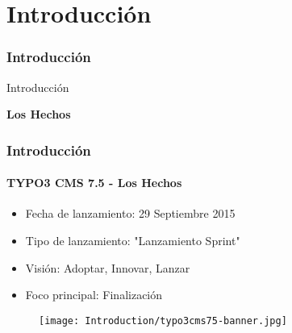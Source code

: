 %

\section{Introducción}
\begin{frame}[fragile]
	\frametitle{Introducción}

	\begin{center}\huge{Introducción}\end{center}
	\begin{center}\huge{\color{typo3darkgrey}\textbf{Los Hechos}}\end{center}

\end{frame}

\begin{frame}[fragile]
	\frametitle{Introducción}
	\framesubtitle{TYPO3 CMS 7.5 - Los Hechos}

	\begin{itemize}
		\item Fecha de lanzamiento: 29 Septiembre 2015
		\item Tipo de lanzamiento: "Lanzamiento Sprint"
		\item Visión: Adoptar, Innovar, Lanzar
		\item Foco principal: Finalización
	\end{itemize}

	\begin{figure}
		\texttt{[image: Introduction/typo3cms75-banner.jpg]}
	\end{figure}

\end{frame}

